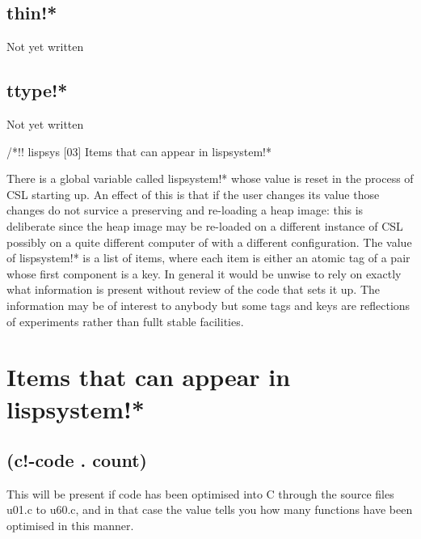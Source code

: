 \documentclass[a4paper,11pt]{article}
\begin{document}
\subsection{\ttfamily thin!*}
Not yet written

\subsection{\ttfamily ttype!*}
Not yet written

/*!! lispsys [03] Items that can appear in {\ttfamily lispsystem!*}
  
There is a global variable called {\ttfamily lispsystem!*} whose value is
reset in the process of CSL starting up. An effect of this is that if the
user changes its value those changes do not survice a preserving and
re-loading a heap image: this is deliberate since the heap image may be
re-loaded on a different instance of CSL possibly on a quite different
computer of with a different configuration. The value of {\ttfamily
lispsystem!*} is a list of items, where each item is either an atomic tag
of a pair whose first component is a key. In general it would be unwise
to rely on exactly what information is present without review of the code
that sets it up. The information may be of interest to anybody but some tags
and keys are reflections of experiments rather than fullt stable facilities.
  

\section{Items that can appear in {\ttfamily lispsystem!*}}

\subsection{\ttfamily (c!-code . count)}
This will be present if code has been optimised into C through the source
files u01.c to u60.c, and in that case the value tells you how many functions
have been optimised in this manner.
  
\end{document}
